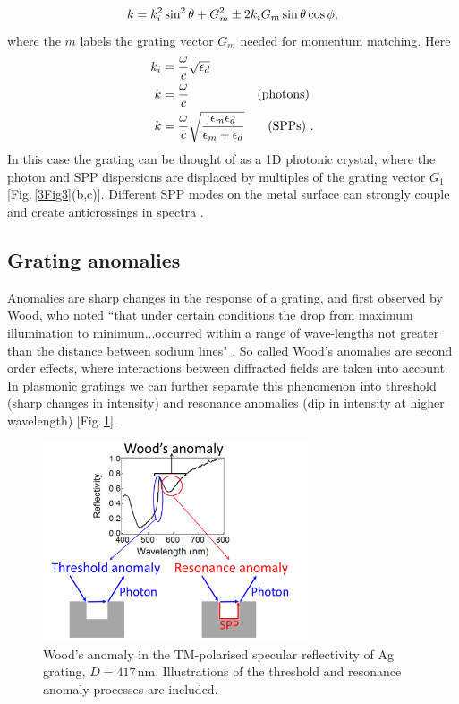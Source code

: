 \begin{equation}
\centering
k = k_i^2\sin^2\theta+G_m^2\pm2k_iG_m\sin\theta\cos\phi ,
\label{GratingDisp}
\end{equation}
where the $m$ labels the grating vector $G_m$ needed for momentum matching. Here
\begin{subequations}
\label{kmodes}
\begin{align}
\centering
k_i &= \frac{\omega}{c}\sqrt{\epsilon_d}& \\
k&=\frac{\omega}{c}& \textnormal{(photons) } \label{kphot} \\
k &= \frac{\omega}{c}\sqrt{\frac{\epsilon_m\epsilon_d}{\epsilon_m+\epsilon_d}}& \textnormal{(SPPs) .} \label{kspp}
\end{align}
\end{subequations}
In this case the grating can be thought of as a 1D photonic crystal, where the photon and SPP dispersions are displaced by multiples of the grating vector $G_1$ [Fig.\,\ref{3Fig3}(b,c)]. Different SPP modes on the metal surface can strongly couple and create anticrossings in spectra \cite{Chen1983}.


\subsection{Grating anomalies}
Anomalies are sharp changes in the response of a grating, and first observed by Wood, who noted ``that under certain conditions the drop from maximum illumination to minimum...occurred within a range of wave-lengths not greater than the distance between sodium lines" \cite{Wood1902}. So called Wood's anomalies are second order effects, where interactions between diffracted fields are taken into account. In plasmonic gratings we can further separate this phenomenon into threshold (sharp changes in intensity) and resonance anomalies (dip in intensity at higher wavelength) [Fig.\,\ref{3Fig4}].
\begin{figure}[h!] 
\centering    
\includegraphics[width=0.7\textwidth]{Fig4}
\caption{Wood's anomaly in the TM-polarised specular reflectivity of Ag grating, $D=417$\,nm. Illustrations of the threshold and resonance anomaly processes are included.}
\label{3Fig4}
\end{figure}

